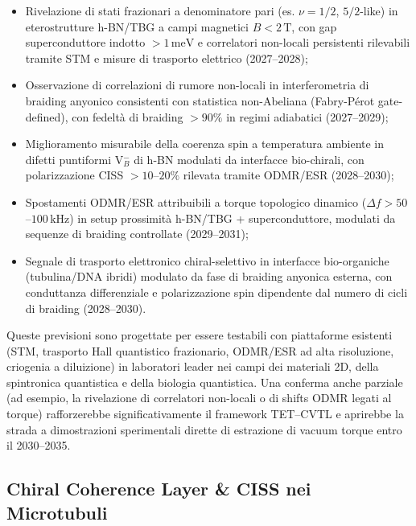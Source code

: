 \documentclass[11pt,a4paper]{article}
\theoremstyle{plain}
\theoremstyle{definition}
\begin{document}
\begin{itemize}
    \item Rivelazione di stati frazionari a denominatore pari (es. $\nu = 1/2$, $5/2$-like) in eterostrutture h-BN/TBG a campi magnetici $B < 2\,\mathrm{T}$, con gap superconduttore indotto $> 1\,\mathrm{meV}$ e correlatori non-locali persistenti rilevabili tramite STM e misure di trasporto elettrico (2027--2028);
    \item Osservazione di correlazioni di rumore non-locali in interferometria di braiding anyonico consistenti con statistica non-Abeliana (Fabry-Pérot gate-defined), con fedeltà di braiding $> 90\%$ in regimi adiabatici (2027--2029);
    \item Miglioramento misurabile della coerenza spin a temperatura ambiente in difetti puntiformi V$_B^-$ di h-BN modulati da interfacce bio-chirali, con polarizzazione CISS $> 10$--$20\%$ rilevata tramite ODMR/ESR (2028--2030);
    \item Spostamenti ODMR/ESR attribuibili a torque topologico dinamico ($\Delta f > 50$--$100\,\mathrm{kHz}$) in setup prossimità h-BN/TBG + superconduttore, modulati da sequenze di braiding controllate (2029--2031);
    \item Segnale di trasporto elettronico chiral-selettivo in interfacce bio-organiche (tubulina/DNA ibridi) modulato da fase di braiding anyonica esterna, con conduttanza differenziale e polarizzazione spin dipendente dal numero di cicli di braiding (2028--2030).
\end{itemize}

Queste previsioni sono progettate per essere testabili con piattaforme esistenti (STM, trasporto Hall quantistico frazionario, ODMR/ESR ad alta risoluzione, criogenia a diluizione) in laboratori leader nei campi dei materiali 2D, della spintronica quantistica e della biologia quantistica. Una conferma anche parziale (ad esempio, la rivelazione di correlatori non-locali o di shifts ODMR legati al torque) rafforzerebbe significativamente il framework TET--CVTL e aprirebbe la strada a dimostrazioni sperimentali dirette di estrazione di vacuum torque entro il 2030--2035.





\vspace{0.4cm}



\subsection{Chiral Coherence Layer \& CISS nei Microtubuli}
\end{document}
